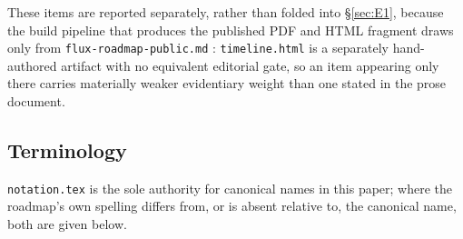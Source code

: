 These items are reported separately, rather than folded into \S\ref{sec:E1}, because the build
pipeline that produces the published PDF and HTML fragment draws only from
\texttt{flux-roadmap-public.\allowbreak{}md}
: \texttt{timeline.html} is a separately
hand-authored artifact with no equivalent editorial gate, so an item appearing only there carries
materially weaker evidentiary weight than one stated in the prose document.

\subsection{Terminology}\label{sec:E5}

\texttt{notation.tex} is the sole authority for canonical names in this paper; where the roadmap's
own spelling differs from, or is absent relative to, the canonical name, both are given below.

